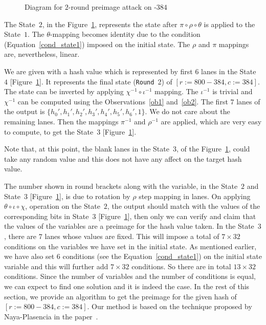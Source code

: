 \begin{figure}[!t]
\begin{center}
{
}
\caption{Diagram for $2$-round preimage attack on \Keccak-$384$ \label{atk}}
\end{center}
\end{figure}
The State~$2$, in the Figure~\ref{atk}, represents the state after $\pi \circ \rho \circ \theta$ is applied to the State~$1$. 
The $\theta$-mapping becomes identity due to the condition
(Equation~\ref{cond_state1}) imposed on the initial state. 
The $\rho$ and $\pi$ mappings are, nevertheless, linear.

We are given with a hash value which is represented by first $6$ lanes in the State~$4$ [Figure~\ref{atk}]. It represents the final state ({\tt Round}~2) of \KECCAK{}$[r:=800-384, c:=384]$. The state can be inverted by applying $\chi^{-1} \circ \iota^{-1}$ mapping. The $\iota^{-1}$ is trivial and $\chi^{-1}$ can be computed using the Observations~\ref{ob1} and~\ref{ob2}. The first $7$ lanes of the output is $\{h_0',h_1',h_2',h_3',h_4',h_5',h_6',1\}$. We do not care about the remaining  lanes. 
Then the mappings $\pi^{-1}$ and $\rho^{-1}$ are applied, which are very easy to compute, to get the State~$3$ [Figure~\ref{atk}]. 

Note that, at this point, the blank lanes in the State~$3$, of the Figure~\ref{atk}, could take any random value and this does not have any affect on the target hash value.

The number shown in round brackets along with the variable, in the State~$2$ and State~$3$ [Figure~\ref{atk}], is due to rotation by $\rho$ step mapping in lanes.
On applying $\theta \circ \iota \circ \chi$, operation on the State~$2$, the output should match with the values of the corresponding bits in State~$3$ [Figure~\ref{atk}], then only we can verify and claim that the values of the variables are a preimage for the hash value taken. In the State~$3$, there are $7$ lanes whose values are fixed. 
This will impose a total of $7\times 32$ conditions on the variables we have set in the initial state. As mentioned earlier, we have also set $6$ conditions (see the Equation~\ref{cond_state1}) on the initial state variable and this will further add $7 \times 32$ conditions. So there are in total $13\times 32$ conditions. Since the number of variables and the number of conditions is equal, we can expect to find one solution and it is indeed the case. In the rest of this section, we provide an algorithm to get the preimage for the given hash of  \KECCAK{}$[r:=800-384, c:=384]$. Our method is based on the technique proposed by Naya-Plasencia \etal in the paper~\cite{naya2011practical}.

